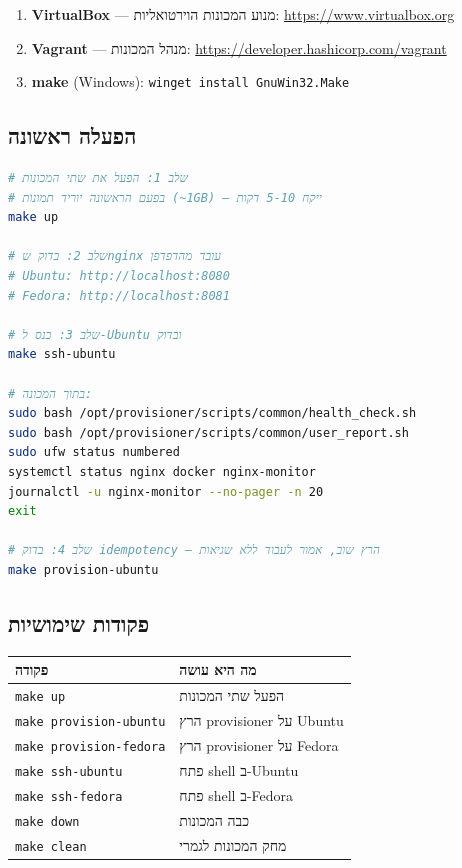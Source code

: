 \documentclass[12pt,a4paper]{article}
\begin{document}
\begin{enumerate}[noitemsep]
  \item \textbf{VirtualBox} — מנוע המכונות הוירטואליות: \url{https://www.virtualbox.org}
  \item \textbf{Vagrant} — מנהל המכונות: \url{https://developer.hashicorp.com/vagrant}
  \item \textbf{make} (Windows): \texttt{winget install GnuWin32.Make}
\end{enumerate}

\subsection{הפעלה ראשונה}

\begin{lstlisting}[language=bash, caption={הרצת הפרויקט לראשונה}]
# שלב 1: הפעל את שתי המכונות
# בפעם הראשונה יוריד תמונות (~1GB) — ייקח 5-10 דקות
make up

# שלב 2: בדוק שnginx עובד מהדפדפן
# Ubuntu: http://localhost:8080
# Fedora: http://localhost:8081

# שלב 3: כנס ל-Ubuntu ובדוק
make ssh-ubuntu

# בתוך המכונה:
sudo bash /opt/provisioner/scripts/common/health_check.sh
sudo bash /opt/provisioner/scripts/common/user_report.sh
sudo ufw status numbered
systemctl status nginx docker nginx-monitor
journalctl -u nginx-monitor --no-pager -n 20
exit

# שלב 4: בדוק idempotency — הרץ שוב, אמור לעבוד ללא שגיאות
make provision-ubuntu
\end{lstlisting}

\subsection{פקודות שימושיות}

\begin{center}
\begin{tabular}{ll}
\toprule
\textbf{פקודה} & \textbf{מה היא עושה} \\
\midrule
\texttt{make up} & הפעל שתי המכונות \\
\texttt{make provision-ubuntu} & הרץ provisioner על Ubuntu \\
\texttt{make provision-fedora} & הרץ provisioner על Fedora \\
\texttt{make ssh-ubuntu} & פתח shell ב-Ubuntu \\
\texttt{make ssh-fedora} & פתח shell ב-Fedora \\
\texttt{make down} & כבה המכונות \\
\texttt{make clean} & מחק המכונות לגמרי \\
\bottomrule
\end{tabular}
\end{center}
\end{document}
